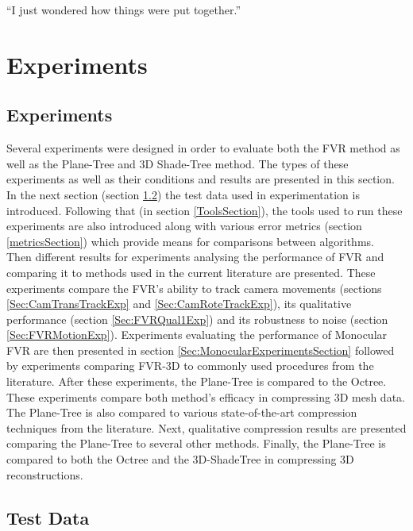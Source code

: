 \begin{savequote}[8cm]
  ``I just wondered how things were put together.''
\end{savequote}
\makeatletter
\chapter{Experiments}
\label{ch:Experiments}

\section{Experiments}

Several experiments were designed in order to evaluate both the FVR method as well as the Plane-Tree and 3D Shade-Tree method. The types of these experiments as well as their conditions and results are presented in this section. In the next section (section \ref{TestDataSection}) the test data used in experimentation is introduced. Following that (in section \ref{ToolsSection}), the tools used to run these experiments are also introduced along with various error metrics (section \ref{metricsSection}) which provide means for comparisons between algorithms. \\

Then different results for experiments analysing the performance of FVR and comparing it to methods used in the current literature are presented. These experiments compare the FVR's ability to track camera movements (sections \ref{Sec:CamTransTrackExp} and \ref{Sec:CamRoteTrackExp}), its qualitative performance (section \ref{Sec:FVRQual1Exp}) and its robustness to noise (section \ref{Sec:FVRMotionExp}). Experiments evaluating the performance of Monocular FVR are then presented in section \ref{Sec:MonocularExperimentsSection} followed by experiments comparing FVR-3D to commonly used procedures from the literature. After these experiments, the Plane-Tree is compared to the Octree. These experiments compare both method's efficacy in compressing 3D mesh data. The Plane-Tree is also compared to various state-of-the-art compression techniques from the literature. Next, qualitative compression results are presented comparing the Plane-Tree to several other methods. Finally, the Plane-Tree is compared to both the Octree and the 3D-ShadeTree in compressing 3D reconstructions. \\


\section{Test Data}
\label{TestDataSection}


